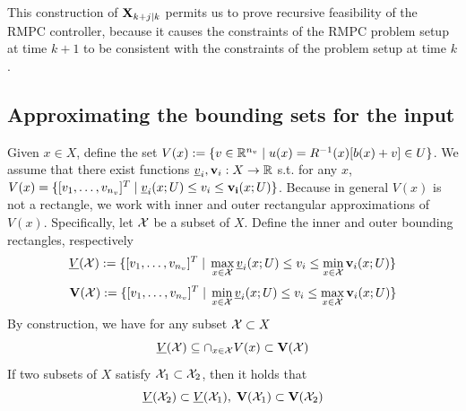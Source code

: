  This construction of $\mathbf{X}_{k+j|k}$ permits us to prove recursive feasibility of the RMPC controller, because it causes the constraints of the RMPC problem setup at time $k+1$ to be consistent with the constraints of the problem setup at time $k$.

\subsection{Approximating the bounding sets for the input}
\label{sec:approx input sets}
Given $x \in X$, define the set $V(x) := \{v \in \mathbb{R}^{n_v} \;|\; u(x) = R^{-1}(x)[b(x)+v] \in U\}$.
We assume that there exist functions $\underline{v}_i, \mathbf{v}_i: X \rightarrow \mathbb{R}$ s.t. for any $x$, $V(x) = \{[v_1,\ldots,v_{n_v}]^T \;|\; \underline{v}_i(x;U) \leq v_i \leq \mathbf{v_i}(x;U) \}$.
Because in general $V(x)$ is not a rectangle, we work with inner and outer rectangular approximations of $V(x)$.
Specifically, let $\mathcal{X}$ be a subset of $X$.
Define the inner and outer bounding rectangles, respectively
{\small 
\[\underline{V}(\mathcal{X}) := \{[v_1,\ldots,v_{n_v}]^T \;|\; \max_{x\in \mathcal{X}} \underline{v}_i(x;U)  \leq v_i \leq \min_{x \in \mathcal{X}} \mathbf{v}_i(x;U) \} \]
\[\mathbf{V}(\mathcal{X}) := \{[v_1,\ldots,v_{n_v}]^T \;|\; \min_{x\in \mathcal{X}} \underline{v}_i(x;U)  \leq v_i \leq \max_{x \in \mathcal{X}} \mathbf{v}_i(x;U) \} \]
}
By construction, we have for any subset $\mathcal{X} \subset X$
\begin{equation}
\label{eq:Vbounds}
\underline{V}(\mathcal{X}) \subseteq \cap_{x \in \mathcal{X}} V(x) \subset \mathbf{V}(\mathcal{X})
\end{equation}
If two subsets of $X$ satisfy $\mathcal{X}_1 \subset \mathcal{X}_2$, then it holds that 
\begin{equation}
\label{eq:V inclusions}
\underline{V}(\mathcal{X}_2) \subset \underline{V}(\mathcal{X}_1), \; \mathbf{V}(\mathcal{X}_1) \subset \mathbf{V}(\mathcal{X}_2)
\end{equation}

